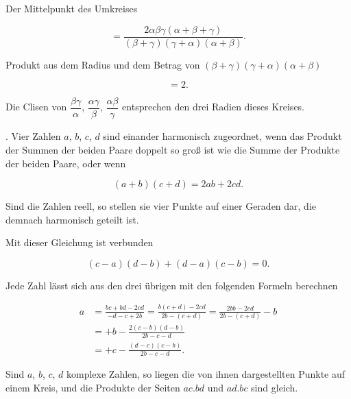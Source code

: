 
Der Mittelpunkt des Umkreises

\[
= \frac{2\alpha\beta\gamma(\alpha+\beta+\gamma)}{(\beta+\gamma)(\gamma+\alpha)(\alpha+\beta)}.
\]

Produkt aus dem Radius und dem Betrag von $(\beta+\gamma)(\gamma+\alpha)(\alpha+\beta)$

\[
= 2.
\]

Die Clisen von $\dfrac{\beta\gamma}{\alpha}$, $\dfrac{\alpha\gamma}{\beta}$, $\dfrac{\alpha\beta}{\gamma}$ entsprechen den drei Radien dieses Kreises.

\medskip
{}. Vier Zahlen $a$, $b$, $c$, $d$ sind einander harmonisch zugeordnet, wenn das
Produkt der Summen der beiden Paare doppelt so groß ist wie die Summe der
Produkte der beiden Paare, oder wenn

\[
(a+b)(c+d) = 2ab+2cd.
\]

Sind die Zahlen reell, so stellen sie vier Punkte auf einer Geraden dar, die
demnach harmonisch geteilt ist.

Mit dieser Gleichung ist verbunden

\[
(c-a)(d-b)+(d-a)(c-b) = 0.
\]

Jede Zahl lässt sich aus den drei übrigen mit den folgenden Formeln berechnen

\[
\begin{aligned}
a &= \frac{bc+bd-2cd}{-d-c+2b} = \frac{b(c+d)-2cd}{2b-(c+d)} = \frac{2bb-2cd}{2b-(c+d)}-b \\
  &= +b-\frac{2(c-b)(d-b)}{2b-c-d} \\
  &= +c-\frac{(d-c)(c-b)}{2b-c-d}.
\end{aligned}
\]

Sind $a$, $b$, $c$, $d$ komplexe Zahlen, so liegen die von ihnen dargestellten Punkte
auf einem Kreis, und die Produkte der Seiten $ac.bd$ und $ad.bc$ sind gleich.

